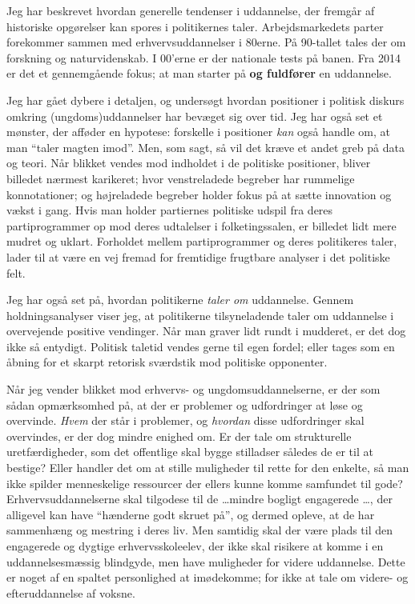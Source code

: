 Jeg har beskrevet hvordan generelle tendenser i uddannelse, der fremgår af historiske opgørelser kan spores i politikernes taler.
Arbejdsmarkedets parter forekommer sammen med erhvervsuddannelser i 80erne.
På 90-tallet tales der om forskning og naturvidenskab.
I 00'erne er der nationale tests på banen.
Fra 2014 er det et gennemgående fokus; at man starter på \textbf{og fuldfører} en uddannelse.

Jeg har gået dybere i detaljen, og undersøgt hvordan positioner i politisk diskurs omkring (ungdoms)uddannelser har bevæget sig over tid.
Jeg har også set et mønster, der afføder en hypotese: forskelle i positioner \textit{kan} også handle om, at man “taler magten imod”.
Men, som sagt, så vil det kræve et andet greb på data og teori.
Når blikket vendes mod indholdet i de politiske positioner, bliver billedet nærmest karikeret;
hvor venstreladede begreber har rummelige konnotationer; og højreladede begreber holder fokus på at sætte innovation og vækst i gang.
Hvis man holder partiernes politiske udspil fra deres partiprogrammer op mod deres udtalelser i folketingssalen, er billedet lidt mere mudret og uklart.
Forholdet mellem partiprogrammer og deres politikeres taler, lader til at være en vej fremad for fremtidige frugtbare analyser i det politiske felt.

Jeg har også set på, hvordan politikerne \textit{taler om} uddannelse.
Gennem holdningsanalyser viser jeg, at politikerne tilsyneladende taler om uddannelse i overvejende positive vendinger.
Når man graver lidt rundt i mudderet, er det dog ikke så entydigt.
Politisk taletid vendes gerne til egen fordel; eller tages som en åbning for et skarpt retorisk sværdstik mod politiske opponenter.

Når jeg vender blikket mod erhvervs- og ungdomsuddannelserne, er der som sådan opmærksomhed på, at der er problemer og udfordringer at løse og overvinde.
\textit{Hvem} der står i problemer, og \textit{hvordan} disse udfordringer skal overvindes, er der dog mindre enighed om.
Er der tale om strukturelle uretfærdigheder, som det offentlige skal bygge stilladser således de er til at bestige?
Eller handler det om at stille muligheder til rette for den enkelte, så man ikke spilder menneskelige ressourcer der ellers kunne komme samfundet til gode?
Erhvervsuddannelserne skal tilgodese til de \ldots mindre bogligt engagerede \ldots, der alligevel kan have “hænderne godt skruet på”, og dermed opleve, at de har sammenhæng og mestring i deres liv.
Men samtidig skal der være plads til den engagerede og dygtige erhvervsskoleelev, der ikke skal risikere at komme i en uddannelsesmæssig blindgyde, men have muligheder for videre uddannelse.
Dette er noget af en spaltet personlighed at imødekomme; for ikke at tale om videre- og efteruddannelse af voksne.

